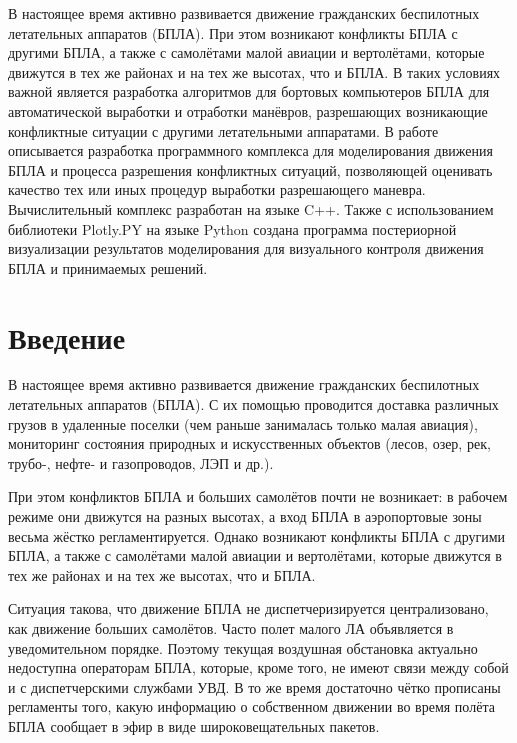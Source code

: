 \documentclass[a4paper,12pt]{article}
\begin{document}
\bigskip

\noindent
В настоящее время активно развивается движение гражданских беспилотных летательных аппаратов (БПЛА). При этом возникают конфликты БПЛА с другими БПЛА, а также с самолётами малой авиации и вертолётами, которые движутся в тех же районах и на тех же высотах, что и БПЛА. В таких условиях важной является разработка алгоритмов для бортовых компьютеров БПЛА для автоматической выработки и отработки манёвров, разрешающих возникающие конфликтные ситуации с другими летательными аппаратами. В работе описывается разработка программного комплекса для моделирования движения БПЛА и процесса разрешения конфликтных ситуаций, позволяющей оценивать качество тех или иных процедур выработки разрешающего маневра. Вычислительный комплекс разработан на языке C++. Также с использованием библиотеки Plotly.PY на языке Python создана программа постериорной визуализации результатов моделирования для визуального контроля движения БПЛА и принимаемых решений. 
  

\newpage
\setcounter{page}{2}
\tableofcontents
\newpage

\newpage
\section*{Введение}

В настоящее время активно развивается движение гражданских беспилотных летательных аппаратов (БПЛА). С их помощью проводится доставка различных грузов в удаленные поселки (чем раньше занималась только малая авиация), мониторинг состояния природных и искусственных объектов (лесов, озер, рек, трубо-, нефте- и газопроводов, ЛЭП и др.).

При этом конфликтов БПЛА и больших самолётов почти не возникает: в рабочем режиме они движутся на разных высотах, а вход БПЛА в аэропортовые зоны весьма жёстко регламентируется. Однако возникают конфликты БПЛА  с другими БПЛА, а также с самолётами малой авиации и вертолётами, которые движутся в тех же районах и на тех же высотах, что и БПЛА. 

Ситуация такова, что движение БПЛА не диспетчеризируется централизовано, как движение больших самолётов. Часто полет малого ЛА объявляется в уведомительном порядке. Поэтому текущая воздушная обстановка актуально недоступна операторам БПЛА, которые, кроме того, не имеют связи между собой и с диспетчерскими службами УВД. В то же время достаточно чётко прописаны регламенты того, какую информацию о собственном движении во время полёта БПЛА сообщает в эфир в виде широковещательных пакетов.
\end{document}
